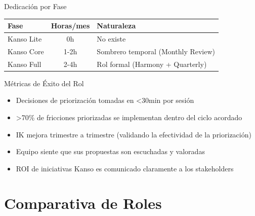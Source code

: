 Dedicación por Fase

\begin{center}
\small
\begin{tabular}{|l|c|l|}
\hline
\textbf{Fase} & \textbf{Horas/mes} & \textbf{Naturaleza} \\ \hline
Kanso Lite & 0h & No existe \\ \hline
Kanso Core & 1-2h & Sombrero temporal (Monthly Review) \\ \hline
Kanso Full & 2-4h & Rol formal (Harmony + Quarterly) \\ \hline
\end{tabular}
\end{center}

Métricas de Éxito del Rol

\begin{itemize}
    \item Decisiones de priorización tomadas en <30min por sesión
    \item >70\% de fricciones priorizadas se implementan dentro del ciclo acordado
    \item IK mejora trimestre a trimestre (validando la efectividad de la priorización)
    \item Equipo siente que sus propuestas son escuchadas y valoradas
    \item ROI de iniciativas Kanso es comunicado claramente a los stakeholders
\end{itemize}

\section{Comparativa de Roles}

